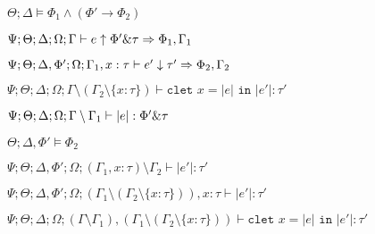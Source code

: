 {{{    $\Theta ; \Delta \vDash \Phi_1 \wedge (\Phi' \to \Phi_2)$  
   
    $\Psi ; \Theta ; \Delta ; \Omega ; \Gamma \vdash e \uparrow \Phi' \& \tau \Rightarrow \Phi_1,\Gamma_1$
   
    $\Psi ; \Theta ; \Delta, \Phi' ; \Omega ; \Gamma_1, x : \tau \vdash e' \downarrow \tau' \Rightarrow \Phi_2, \Gamma_2$
  }{
     $\Psi ; \Theta ; \Delta ; \Omega ; \Gamma \setminus (\Gamma_2 \setminus \{x : \tau\}) \vdash \texttt{clet } x = |e| \texttt{ in } |e'| : \tau'$
  }
  
  
   $\Psi ; \Theta ; \Delta ; \Omega ; \Gamma \setminus \Gamma_1 \vdash |e| : \Phi' \& \tau$
  
  
   $\Theta ; \Delta, \Phi' \vDash \Phi_2$
  
  
   $\Psi ; \Theta ; \Delta, \Phi' ; \Omega ; (\Gamma_1, x : \tau) \setminus \Gamma_2 \vdash |e'| : \tau'$
  
  
   $\Psi ; \Theta ; \Delta, \Phi' ; \Omega ; (\Gamma_1 \setminus (\Gamma_2 \setminus \{x : \tau\})), x : \tau\vdash |e'| : \tau'$
  
  
   $\Psi ; \Theta ; \Delta ; \Omega ; (\Gamma \setminus \Gamma_1), (\Gamma_1 \setminus (\Gamma_2 \setminus \{x : \tau\})) \vdash \texttt{clet } x = |e| \texttt{ in } |e'| : \tau'$
  
 }
 
 }
